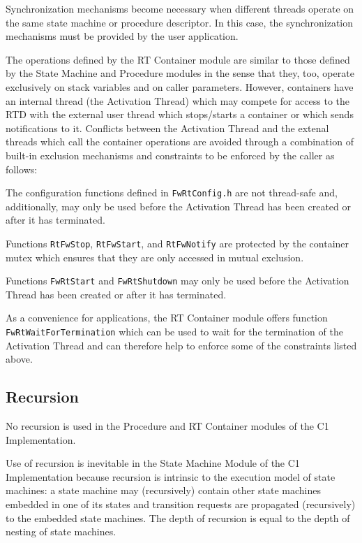 \documentclass[manual]{../fwprofile}
\begin{document}
Synchronization mechanisms become necessary when different threads operate on the same state machine or procedure descriptor. In this case, the synchronization mechanisms must be provided by the user application.  

The operations defined by the RT Container module are similar to those defined by the State Machine and Procedure modules in the sense that they, too, operate exclusively on stack variables and on caller parameters. However, containers have an internal thread (the Activation Thread) which may compete for access to the RTD with the external user thread which stops/starts a container or which sends notifications to it. Conflicts between the Activation Thread and the extenal threads which call the container operations are avoided through a combination of built-in exclusion mechanisms and constraints to be enforced by the caller as follows:

\begin{fw_itemize}
\item The configuration functions defined in \texttt{FwRtConfig.h} are not thread-safe and, additionally, may only be used before the Activation Thread has been created or after it has terminated. 
\item Functions \texttt{RtFwStop}, \texttt{RtFwStart}, and \texttt{RtFwNotify} are protected by the container mutex which ensures that they are only accessed in mutual exclusion.
\item Functions \texttt{FwRtStart} and \texttt{FwRtShutdown} may only be used before the Activation Thread has been created or after it has terminated.  
\end{fw_itemize}

As a convenience for applications, the RT Container module offers function \texttt{FwRtWaitForTermination} which can be used to wait for the termination of the Activation Thread and can therefore help to enforce some of the constraints listed above. 

\subsection{Recursion}
No recursion is used in the Procedure and RT Container modules of the C1 Implementation.

Use of recursion is inevitable in the State Machine Module of the C1 Implementation because recursion 
is intrinsic to the execution model of state machines: a state machine may 
(recursively) contain other state machines embedded in one of its states and transition requests 
are propagated (recursively) to the embedded state machines. 
The depth of recursion is equal to the depth of nesting of state machines.
\end{document}

